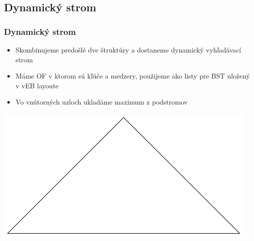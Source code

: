 \documentclass{beamer}
\begin{document}
\subsection{Dynamický strom}
\begin{frame}
    \frametitle{Dynamický strom}
    \begin{itemize}
        \item Skombinujeme predošlé dve štruktúry a dostaneme dynamický vyhľadávací strom
        \item Máme OF v ktorom sú kľúče a medzery, použijeme ako listy pre BST uložený v vEB layoute
        \item Vo vnútorných uzloch ukladáme maximum z podstromov
    \end{itemize}
    \begin{center}
        \includegraphics[height=0.5\textheight]{../figures/dynamic_tree/overview}
    \end{center}
\end{frame}
\end{document}

